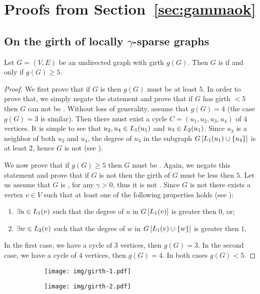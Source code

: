 \section{Proofs from Section~\ref{sec:gammaok}} \label{app:gamma}

\subsection{On the girth of locally \texorpdfstring{$\gamma$}{gamma}-sparse graphs}
\begin{lemma}\label{lemma:girth_rev}
    Let $G = (V,E)$ be an undirected graph with girth $g(G)$.
    Then $G$ is  if and only if $g(G) \geq 5$.
\end{lemma}
\begin{proof}
    We first prove that if $G$ is  then $g(G)$ must be at least $5$.
    In order to prove that, we simply negate the statement and prove that if $G$ has girth $<5$ then $G$ can not be .
    Without loss of generality, assume that $g(G) = 4$ (the case $g(G) = 3$ is similar).
    Then there must exist a cycle $C = (u_1, u_2, u_3, u_4)$ of $4$ vertices.
    It is simple to see that $u_2,u_4 \in L_1(u_1)$ and $u_3 \in L_2(u_1)$.
    Since $u_3$ is a neighbor of both $u_2$ and $u_4$, the degree of $u_3$ in the subgraph $G\left[L_1(u_1) \cup \{u_4\} \right]$ is at least $2$, hence $G$ is not  (see ).
    
    We now prove that if $g(G) \geq 5$ then $G$ must be .
    Again, we negate this statement and prove that if $G$ is not  then the girth of $G$ must be less then $5$.
    Let us assume that $G$ is \gammaok, for any $\gamma > 0$, thus it is not .
    Since $G$ is not  there exists a vertex $v \in V$ such that at least one of the following properties holds (see ):
    \begin{enumerate}
        \item $\exists u \in L_1(v)$ such that the degree of $u$ in $G\left[ L_1(v) \right]$ is greater then $0$, or;
        \item $\exists w \in L_2(v)$ such that the degree of $w$ in $G\left[ L_1(v) \cup \{ w \} \right]$ is greater then $1$.
    \end{enumerate}
    In the first case, we have a cycle of $3$ vertices, then $g(G) = 3$.
    In the second case, we have a cycle of $4$ vertices, then $g(G) = 4$.
    In both cases $g(G) < 5$.
\end{proof}
\begin{figure}[h]
    \centering
    \begin{subfigure}[b]{0.35\linewidth}
            \centering
            \texttt{[image: img/girth-1.pdf]}
            \caption{}
            \label{subfig:girth1}
    \end{subfigure}
    \begin{subfigure}[b]{0.6\linewidth}
            \centering
            \texttt{[image: img/girth-2.pdf]}
            \caption{}
            \label{subfig:girth2}
    \end{subfigure}%
    \caption{}
    \label{fig:example_girth}
\end{figure}

